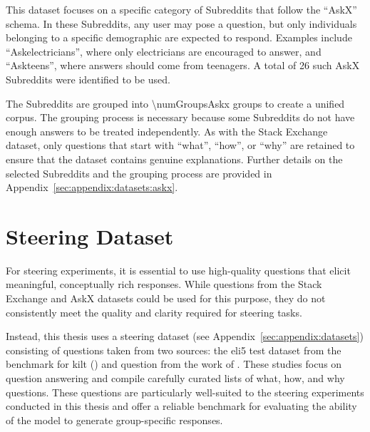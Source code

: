 This dataset focuses on a specific category of Subreddits that follow the \enquote{AskX} schema. In these Subreddits, any user may pose a question, but only individuals belonging to a specific demographic are expected to respond. Examples include \enquote{Askelectricians}, where only electricians are encouraged to answer, and \enquote{Askteens}, where answers should come from teenagers. A total of \num{26} such AskX Subreddits were identified to be used.

The Subreddits are grouped into \num{\numGroupsAskx} groups to create a unified corpus. The grouping process is necessary because some Subreddits do not have enough answers to be treated independently. As with the Stack Exchange dataset, only questions that start with \enquote{what}, \enquote{how}, or \enquote{why} are retained to ensure that the dataset contains genuine explanations. Further details on the selected Subreddits and the grouping process are provided in Appendix~\ref{sec:appendix:datasets:askx}.

\section{Steering Dataset}%
\label{sec:datasets:steering}
For steering experiments, it is essential to use high-quality questions that elicit meaningful, conceptually rich responses. While questions from the Stack Exchange and AskX datasets could be used for this purpose, they do not consistently meet the quality and clarity required for steering tasks.

Instead, this thesis uses a steering dataset (see Appendix~\ref{sec:appendix:datasets}) consisting of questions taken from two sources: the \ac{eli5} test dataset from the benchmark for \acf{kilt} (\cite{petroni-etal-2021-kilt,fan-etal-2019-eli5}) and question from the work of \citet{rooeinKnowYourAudience2023}. These studies focus on question answering and compile carefully curated lists of what, how, and why questions. These questions are particularly well-suited to the steering experiments conducted in this thesis and offer a reliable benchmark for evaluating the ability of the model to generate group-specific responses.
